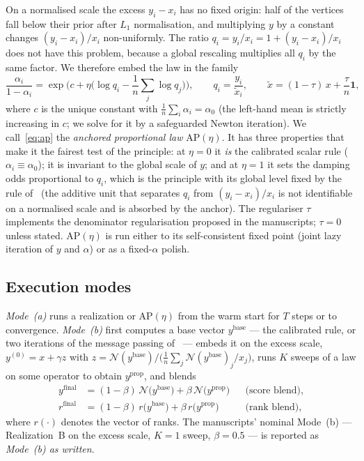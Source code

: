 \documentclass[11pt,a4paper]{article}
\theoremstyle{definition}
\theoremstyle{plain}
\newcommand{\N}{\mathcal{N}}
\newcommand{\AP}{\mathrm{AP}}
\newcommand{\one}{\mathbf{1}}
\begin{document}
On a normalised scale the excess $y_i-x_i$ has no fixed origin: half of the vertices fall below their prior after $L_1$ normalisation, and multiplying $y$ by a constant changes $(y_i-x_i)/x_i$ non-uniformly. The ratio $q_i=y_i/x_i=1+(y_i-x_i)/x_i$ does not have this problem, because a global rescaling multiplies all $q_i$ by the same factor. We therefore embed the law in the family
\begin{equation}\label{eq:ap}
\frac{\alpha_i}{1-\alpha_i}=\exp\Big(c+\eta\Big(\log q_i-\frac1n\sum_{j}\log q_j\Big)\Big),\qquad q_i=\frac{y_i}{\tilde x_i},\qquad \tilde x=(1-\tau)\,x+\frac{\tau}{n}\one,
\end{equation}
where $c$ is the unique constant with $\frac1n\sum_i\alpha_i=\alpha_0$ (the left-hand mean is strictly increasing in $c$; we solve for it by a safeguarded Newton iteration). We call~\eqref{eq:ap} the \emph{anchored proportional law} $\AP(\eta)$. It has three properties that make it the fairest test of the principle: at $\eta=0$ it \emph{is} the calibrated scalar rule ($\alpha_i\equiv\alpha_0$); it is invariant to the global scale of $y$; and at $\eta=1$ it sets the damping odds proportional to $q_i$, which is the principle with its global level fixed by the rule of~\cite{konstantellos26} (the additive unit that separates $q_i$ from $(y_i-x_i)/x_i$ is not identifiable on a normalised scale and is absorbed by the anchor). The regulariser $\tau$ implements the denominator regularisation proposed in the manuscripts; $\tau=0$ unless stated. $\AP(\eta)$ is run either to its self-consistent fixed point (joint lazy iteration of $y$ and $\alpha$) or as a fixed-$\alpha$ polish.

\subsection{Execution modes}\label{sec:modes}

\emph{Mode~(a)} runs a realization or $\AP(\eta)$ from the warm start for $T$ steps or to convergence. \emph{Mode~(b)} first computes a base vector $y^{\mathrm{base}}$ --- the calibrated rule, or two iterations of the message passing of~\cite{knz14} --- embeds it on the excess scale, $y^{(0)}=x+\gamma z$ with $z=\N(y^{\mathrm{base}})/\big(\tfrac1n\sum_j\N(y^{\mathrm{base}})_j/x_j\big)$, runs $K$ sweeps of a law on some operator to obtain $y^{\mathrm{prop}}$, and blends
\begin{align}
y^{\mathrm{final}}&=(1-\beta)\,\N\big(y^{\mathrm{base}}\big)+\beta\,\N\big(y^{\mathrm{prop}}\big) &&\text{(score blend)},\label{eq:blend}\\
r^{\mathrm{final}}&=(1-\beta)\,r\big(y^{\mathrm{base}}\big)+\beta\,r\big(y^{\mathrm{prop}}\big) &&\text{(rank blend)},\nonumber
\end{align}
where $r(\cdot)$ denotes the vector of ranks. The manuscripts' nominal Mode~(b) --- Realization~B on the excess scale, $K=1$ sweep, $\beta=0.5$ --- is reported as \emph{Mode~(b) as written}.
\end{document}
